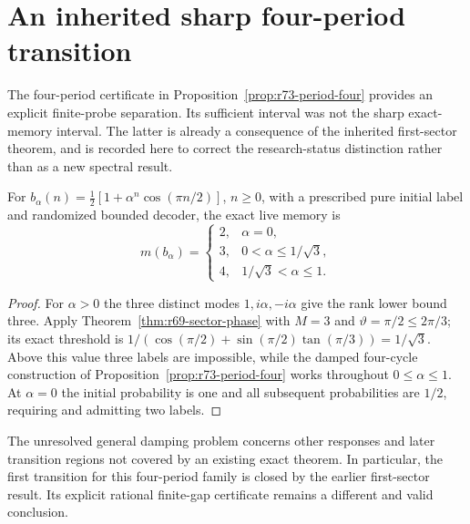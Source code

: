 \section{An inherited sharp four-period transition}
\label{sec:r74-period-four-closure}

The four-period certificate in Proposition~\ref{prop:r73-period-four}
provides an explicit finite-probe separation. Its sufficient interval was
not the sharp exact-memory interval. The latter is already a consequence
of the inherited first-sector theorem, and is recorded here to correct
the research-status distinction rather than as a new spectral result.

\begin{corollary}
\label{cor:r74-period-four-closed}
For $b_\alpha(n)=\tfrac12[1+\alpha^n\cos(\pi n/2)]$, $n\ge0$, with a
prescribed pure initial label and randomized bounded decoder, the exact
live memory is
\[
 m(b_\alpha)=
 \begin{cases}
 2,&\alpha=0,\\
 3,&0<\alpha\le1/\sqrt3,\\
 4,&1/\sqrt3<\alpha\le1.
 \end{cases}
\]
\end{corollary}
\begin{proof}
For $\alpha>0$ the three distinct modes $1,i\alpha,-i\alpha$ give the
rank lower bound three. Apply Theorem~\ref{thm:r69-sector-phase} with
$M=3$ and $\vartheta=\pi/2\le2\pi/3$; its exact threshold is
$1/(\cos(\pi/2)+\sin(\pi/2)\tan(\pi/3))=1/\sqrt3$.
Above this value three labels are impossible, while the damped four-cycle
construction of Proposition~\ref{prop:r73-period-four} works throughout
$0\le\alpha\le1$. At $\alpha=0$ the initial probability is one and all
subsequent probabilities are $1/2$, requiring and admitting two labels.
\end{proof}

The unresolved general damping problem concerns other responses and later
transition regions not covered by an existing exact theorem. In particular,
the first transition for this four-period family is closed by the earlier
first-sector result. Its explicit rational finite-gap certificate remains a
different and valid conclusion.
